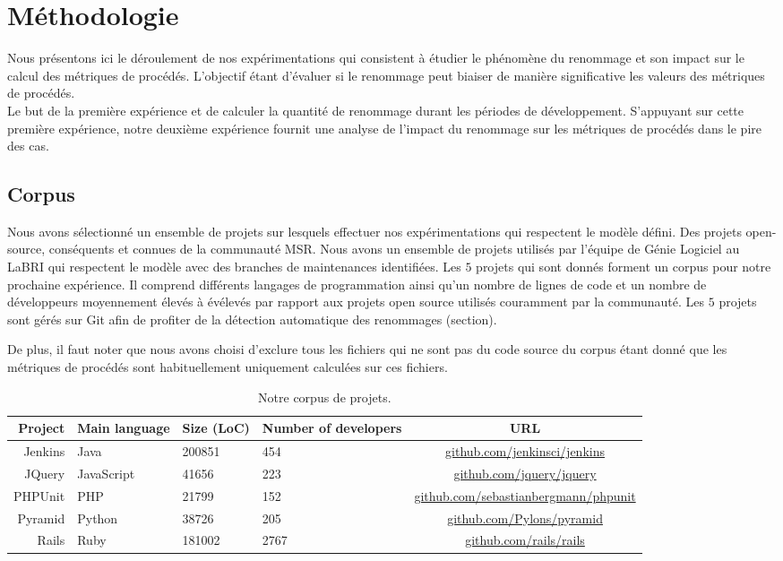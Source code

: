 \section{Méthodologie}
\label{sec:methodologie}

Nous présentons ici le déroulement de nos expérimentations qui consistent à étudier le phénomène du renommage et son impact sur le calcul des métriques de procédés. L’objectif étant d’évaluer si le renommage peut biaiser de manière significative les valeurs des métriques de procédés.\\

Le but de la première expérience et de calculer la quantité de renommage durant les périodes de développement. S’appuyant sur cette première expérience, notre deuxième expérience fournit une analyse de l’impact du renommage sur les métriques de procédés dans le pire des cas. \\

\subsection{Corpus}

Nous avons sélectionné un ensemble de projets sur lesquels effectuer nos expérimentations qui respectent le modèle défini. Des projets open-source, conséquents et connues de la communauté MSR. Nous avons un ensemble de projets utilisés par l'équipe de Génie Logiciel au LaBRI qui respectent le modèle avec des branches de maintenances identifiées. Les $5$ projets qui sont donnés  forment un corpus pour notre prochaine expérience. Il comprend différents langages de programmation ainsi qu'un nombre de lignes de code et un nombre de développeurs moyennement élevés à évélevés par rapport aux projets open source utilisés couramment par la communauté. Les $5$ projets sont gérés sur Git afin de profiter de la détection automatique des renommages (section). 

De plus, il faut noter que nous avons choisi d'exclure tous les fichiers qui ne sont pas du code source du corpus étant donné que les métriques de procédés sont habituellement uniquement calculées sur ces fichiers. \\

\begin{table}[h]
\centering
\small
\begin{tabular}{rllp{1.7cm}c}
\toprule
Project & Main language & Size (LoC) & Number of developers & URL\\
\midrule
Jenkins & Java & 200851 & 454 & \url{github.com/jenkinsci/jenkins} \\
JQuery & JavaScript & 41656 & 223 & \url{github.com/jquery/jquery} \\
PHPUnit & PHP & 21799 & 152 & \url{github.com/sebastianbergmann/phpunit}\\
Pyramid & Python & 38726 & 205 & \url{github.com/Pylons/pyramid} \\
Rails & Ruby & 181002 & 2767 & \url{github.com/rails/rails}\\
\bottomrule
\end{tabular}
\caption{Notre corpus de projets.}
\label{tab:projects}
\end{table}


